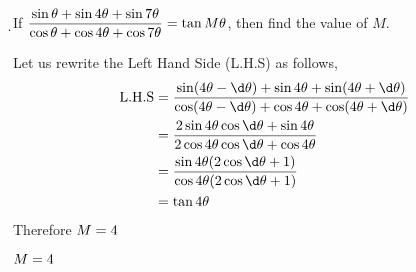 
\SUBTRACT\vb\va\d

\question[3] If $\dfrac{\sin\theta + \sin 4\theta + \sin 7\theta}
  	{\cos \theta + \cos 4\theta + \cos 7\theta} = \tan M\theta $, then
  	find the value of $M$.

\begin{solution}[\halfpage]
  Let us rewrite the Left Hand Side (L.H.S) as follows,
  \begin{align}
    \text{L.H.S} &= \dfrac{\sin(\va\theta - \d\theta ) + \sin \va\theta + 
    						\sin (\va\theta + \d\theta)}
  						  {\cos (\va\theta - \d\theta) + \cos \va\theta + 
  							\cos (\va\theta + \d\theta)} \\
				 &= \dfrac{2\sin \va\theta \cos \d\theta + \sin \va\theta}
				  		  {2\cos \va\theta \cos \d\theta + \cos \va\theta} \\
				 &= \dfrac{\sin \va\theta(2\cos \d\theta + 1)}
				  		  {\cos \va\theta(2\cos \d\theta + 1)} \\
				 &= \tan \va\theta
  \end{align}
  Therefore $M=4$
\end{solution}

\ifprintanswers\begin{codex}$M=4$\end{codex}\fi
